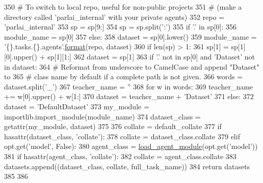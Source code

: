 \begin{DoxyCode}
350             \textcolor{comment}{# To switch to local repo, useful for non-public projects}
351             \textcolor{comment}{# (make a directory called 'parlai\_internal' with your private agents)}
352             repo = \textcolor{stringliteral}{'parlai\_internal'}
353             sp = sp[9:]
354         sp = sp.split(\textcolor{stringliteral}{':'})
355         \textcolor{keywordflow}{if} \textcolor{stringliteral}{'.'} \textcolor{keywordflow}{in} sp[0]:
356             module\_name = sp[0]
357         \textcolor{keywordflow}{else}:
358             dataset = sp[0].lower()
359             module\_name = \textcolor{stringliteral}{'\{\}.tasks.\{\}.agents'}.\hyperlink{namespaceparlai_1_1chat__service_1_1services_1_1messenger_1_1shared__utils_a32e2e2022b824fbaf80c747160b52a76}{format}(repo, dataset)
360         \textcolor{keywordflow}{if} len(sp) > 1:
361             sp[1] = sp[1][0].upper() + sp[1][1:]
362             dataset = sp[1]
363             \textcolor{keywordflow}{if} \textcolor{stringliteral}{'.'} \textcolor{keywordflow}{not} \textcolor{keywordflow}{in} sp[0] \textcolor{keywordflow}{and} \textcolor{stringliteral}{'Dataset'} \textcolor{keywordflow}{not} \textcolor{keywordflow}{in} dataset:
364                 \textcolor{comment}{# Reformat from underscore to CamelCase and append "Dataset" to}
365                 \textcolor{comment}{# class name by default if a complete path is not given.}
366                 words = dataset.split(\textcolor{stringliteral}{'\_'})
367                 teacher\_name = \textcolor{stringliteral}{''}
368                 \textcolor{keywordflow}{for} w \textcolor{keywordflow}{in} words:
369                     teacher\_name += w[0].upper() + w[1:]
370                 dataset = teacher\_name + \textcolor{stringliteral}{'Dataset'}
371         \textcolor{keywordflow}{else}:
372             dataset = \textcolor{stringliteral}{'DefaultDataset'}
373         my\_module = importlib.import\_module(module\_name)
374         dataset\_class = getattr(my\_module, dataset)
375 
376         collate = default\_collate
377         \textcolor{keywordflow}{if} hasattr(dataset\_class, \textcolor{stringliteral}{'collate'}):
378             collate = dataset\_class.collate
379         \textcolor{keywordflow}{elif} opt.get(\textcolor{stringliteral}{'model'}, \textcolor{keyword}{False}):
380             agent\_class = \hyperlink{namespaceparlai_1_1core_1_1loader_a8e6a8f524cba24b80e9bd157c2e0ab8b}{load\_agent\_module}(opt.get(\textcolor{stringliteral}{'model'}))
381             \textcolor{keywordflow}{if} hasattr(agent\_class, \textcolor{stringliteral}{'collate'}):
382                 collate = agent\_class.collate
383         datasets.append((dataset\_class, collate, full\_task\_name))
384     \textcolor{keywordflow}{return} datasets
385 
386 
\end{DoxyCode}
\mbox{\label{namespaceparlai_1_1core_1_1pytorch__data__teacher_a7b71207eb86027bc93809c1e4d57f641}} 
